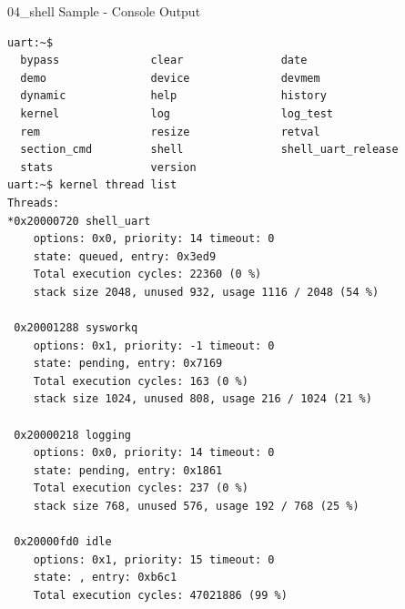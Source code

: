 \documentclass[10pt, aspectratio=169]{beamer}
\begin{document}
\begin{frame}[fragile]{04\_shell Sample - Console Output}
  \begin{listing}[H]
    \begin{verbatim}
uart:~$ 
  bypass              clear               date
  demo                device              devmem
  dynamic             help                history
  kernel              log                 log_test
  rem                 resize              retval
  section_cmd         shell               shell_uart_release
  stats               version
uart:~$ kernel thread list
Threads:
*0x20000720 shell_uart
	options: 0x0, priority: 14 timeout: 0
	state: queued, entry: 0x3ed9
	Total execution cycles: 22360 (0 %)
	stack size 2048, unused 932, usage 1116 / 2048 (54 %)

 0x20001288 sysworkq
	options: 0x1, priority: -1 timeout: 0
	state: pending, entry: 0x7169
	Total execution cycles: 163 (0 %)
	stack size 1024, unused 808, usage 216 / 1024 (21 %)

 0x20000218 logging
	options: 0x0, priority: 14 timeout: 0
	state: pending, entry: 0x1861
	Total execution cycles: 237 (0 %)
	stack size 768, unused 576, usage 192 / 768 (25 %)

 0x20000fd0 idle
	options: 0x1, priority: 15 timeout: 0
	state: , entry: 0xb6c1
	Total execution cycles: 47021886 (99 %)
    \end{verbatim}
  \end{listing}
\end{frame}
\end{document}
